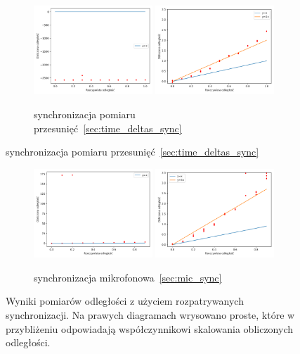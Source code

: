 \begin{figure}[H]
    \ContinuedFloat\centering
    \begin{subfigure}{\textwidth}
        \centering
        \includegraphics[width=0.49\textwidth]{pics/time_deltas_dist/dists.png}
        \includegraphics[width=0.49\textwidth]{pics/time_deltas_dist/dists_close.png}
        \caption{synchronizacja pomiaru przesunięć~\ref{sec:time_deltas_sync}}
        \label{pic:time_deltas_dist}
    \end{subfigure}
\end{figure}
\begin{figure}[H]
    \ContinuedFloat\centering
    \begin{subfigure}{\textwidth}
        \centering
        \includegraphics[width=0.49\textwidth]{pics/mic_sync_dist/dists.png}
        \includegraphics[width=0.49\textwidth]{pics/mic_sync_dist/dists_close.png}
        \caption{synchronizacja mikrofonowa~\ref{sec:mic_sync}}
        \label{pic:mic_sync_dist}
    \end{subfigure}
    \caption{Wyniki pomiarów odległości z użyciem rozpatrywanych synchronizacji. Na prawych diagramach wrysowano proste, które w przybliżeniu odpowiadają współczynnikowi skalowania obliczonych odległości.}
    \label{fig:sync_test}
\end{figure}

